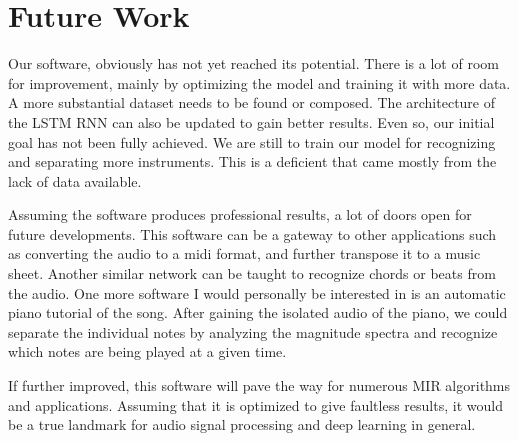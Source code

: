 \documentclass[../Thesis.tex]{subfiles}
\begin{document}
\section {Future Work}

Our software, obviously has not yet reached its potential. There is a lot of room for improvement, mainly by optimizing the model and training it with more data. A more substantial dataset needs to be found or composed. The architecture of the LSTM RNN can also be updated to gain better results. Even so, our initial goal has not been fully achieved. We are still to train our model for recognizing and separating more instruments. This is a deficient that came mostly from the lack of data available.

Assuming the software produces professional results, a lot of doors open for future developments. This software can be a gateway to other applications such as converting the audio to a midi format, and further transpose it to a music sheet. Another similar network can be taught to recognize chords or beats from the audio. One more software I would personally be interested in is an automatic piano tutorial of the song. After gaining the isolated audio of the piano, we could separate the individual notes by analyzing the magnitude spectra and recognize which notes are being played at a given time. 

If further improved, this software will pave the way for numerous MIR algorithms and applications. Assuming that it is optimized to give faultless results, it would be a true landmark for audio signal processing and deep learning in general.
\end{document}
